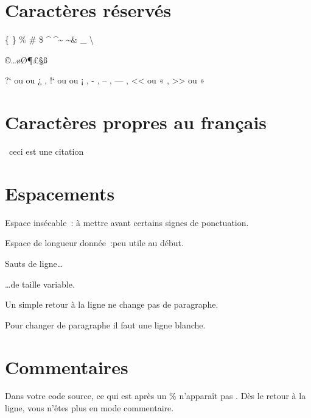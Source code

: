 \documentclass[a4paper, 11pt]{article}
\begin{document}
  \section{Caractères réservés}

    \{ \} \% \# \$ \^{} \textasciicircum \~{} \textasciitilde \& \_ \textbackslash

    \copyright \dag \ddag \dots \o \O \P \pounds \S \ss \textbar \textperiodcentered \textregistered \texttrademark \textvisiblespace 

    ?` ou \textquestiondown  ou ¿ , !` ou \textexclamdown  ou ¡ , - , -- , --- , << ou « , >> ou »

  \section{Caractères propres au français}

    \og~ceci est une citation~\fg

    \degres{}  \ier{}  \iere{}  \iers{}  \ieme{}  \iemes{}

  \section{Espacements}

    Espace insécable~: à mettre avant certains signes de ponctuation. \smallskip

    Espace de longueur donnée~:\hspace{2cm}peu utile au début. \medskip

    Sauts de ligne… \bigskip

    …de taille variable.

    Un simple retour à la ligne
    ne change pas de paragraphe.

    Pour changer de paragraphe il faut une ligne blanche.

  \section{Commentaires}

    Dans votre code source, ce qui est après un \% n'apparaît pas%
    . Dès le retour à la ligne, vous n'êtes plus en mode commentaire.
\end{document}
